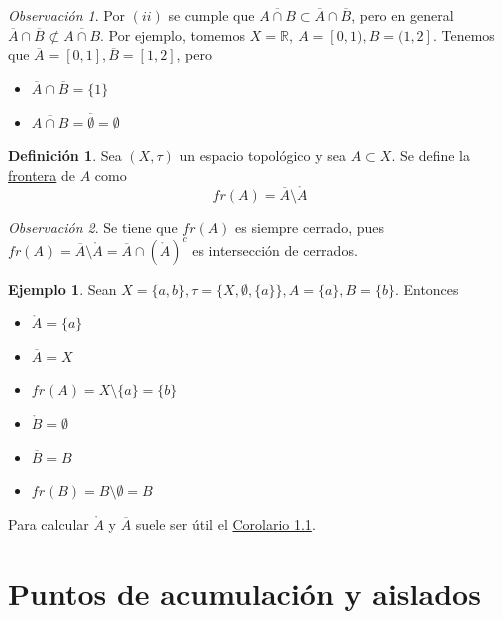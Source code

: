 \documentclass[12pt]{report}
\theoremstyle{definition}
\newtheorem{definition}{Definición}[chapter]
\theoremstyle{definition}
\newtheorem{example}{Ejemplo}[chapter]
\theoremstyle{remark}
\newtheorem*{obs}{Observación} %
\newcommand{\R}{\mathbb R}
\begin{document}
\begin{obs}
Por $(ii)$ se cumple que $\overline{A \cap B} \subset \overline{A} \cap \overline{B}$, pero en general $\overline{A} \cap \overline{B} \not\subset \overline{A \cap B}$. Por ejemplo, tomemos $X = \R, \ A = [0,1), B = (1,2]$. Tenemos que $\overline{A} = [0,1], \overline{B}=[1,2]$, pero
\begin{itemize}
    \item $\overline{A} \cap \overline{B} = \{1\}$
    \item $\overline{A \cap B} = \overline{\emptyset} = \emptyset$
\end{itemize}
\end{obs}

\vspace{2mm}
\begin{definition}
Sea $(X,\tau)$ un espacio topológico y sea $A \subset X$. Se define la \underline{frontera} de $A$ como \[fr(A) = \overline{A} \setminus \mathring{A}\]
\end{definition}

\begin{obs}
Se tiene que $fr(A)$ es siempre cerrado, pues $fr(A) = \overline{A} \setminus \mathring{A} = \overline{A} \cap (\mathring{A})^c$ es intersección de cerrados.
\end{obs}

\begin{example}
Sean $X = \{a,b\}, \tau = \{X, \emptyset, \{a\}\}, A = \{a\}, B = \{b\}$. Entonces
\begin{multicols}{2}
\begin{itemize}
    \item $\mathring{A} = \{a\}$
    \item $\overline{A} = X$
    \item $fr(A) = X \setminus \{a\} = \{b\}$
    \item $\mathring{B} = \emptyset$
    \item $\overline{B} = B$
    \item $fr(B) = B \setminus \emptyset = B$
\end{itemize}
\end{multicols}
Para calcular $\mathring{A}$ y $\overline{A}$ suele ser útil el \hyperref[cor1.1.]{\color{blue}Corolario 1.1}.
\end{example}


\section{Puntos de acumulación y aislados}
\end{document}
